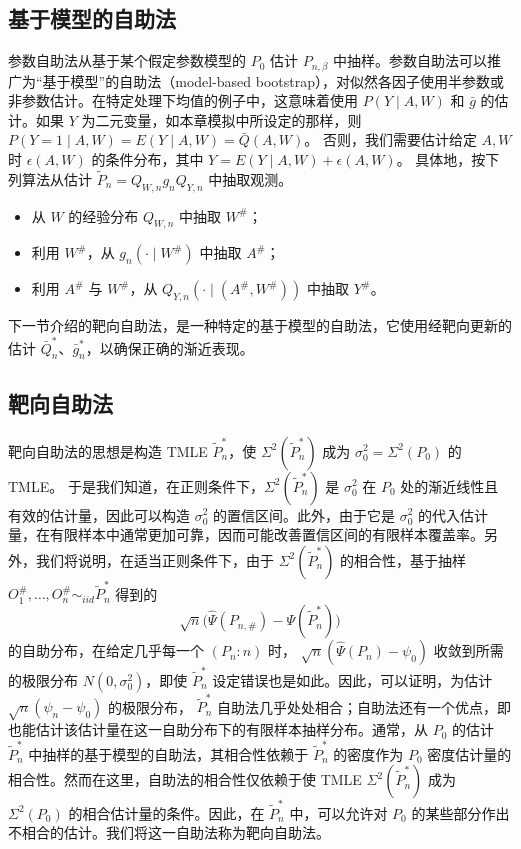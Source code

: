\subsection{基于模型的自助法}

参数自助法从基于某个假定参数模型的 $P_0$ 估计 $P_{n,\beta}$ 中抽样。参数自助法可以推广为“基于模型”的自助法（model-based bootstrap），对似然各因子使用半参数或非参数估计。在特定处理下均值的例子中，这意味着使用 $P(Y\mid A,W)$ 和 $\bar g$ 的估计。如果 $Y$ 为二元变量，如本章模拟中所设定的那样，则
$P(Y=1\mid A,W)=E(Y\mid A,W)=\bar Q(A,W)$。
否则，我们需要估计给定 $A,W$ 时 $\epsilon(A,W)$ 的条件分布，其中
$Y=E(Y\mid A,W)+\epsilon(A,W)$。
具体地，按下列算法从估计 $\tilde P_n=Q_{W,n}g_nQ_{Y,n}$ 中抽取观测。

\noindent\begin{minipage}{\linewidth}
\begin{sourcebox}[算法。基于模型的自助法]
\begin{itemize}[label=$\star$,leftmargin=1.6em]
\item 从 $W$ 的经验分布 $Q_{W,n}$ 中抽取 $W^\#$；
\item 利用 $W^\#$，从 $g_n(\cdot\mid W^\#)$ 中抽取 $A^\#$；
\item 利用 $A^\#$ 与 $W^\#$，从
$Q_{Y,n}(\cdot\mid(A^\#,W^\#))$ 中抽取 $Y^\#$。
\end{itemize}
\end{sourcebox}
\end{minipage}\par

下一节介绍的靶向自助法，是一种特定的基于模型的自助法，它使用经靶向更新的估计 $\bar Q_n^*$、$\bar g_n^*$，以确保正确的渐近表现。

\subsection{靶向自助法}

靶向自助法的思想是构造 TMLE $\tilde P_n^*$，使
$\Sigma^2(\tilde P_n^*)$ 成为 $\sigma_0^2=\Sigma^2(P_0)$ 的 TMLE。
于是我们知道，在正则条件下，$\Sigma^2(\tilde P_n^*)$ 是 $\sigma_0^2$ 在 $P_0$ 处的渐近线性且有效的估计量，因此可以构造 $\sigma_0^2$ 的置信区间。此外，由于它是 $\sigma_0^2$ 的代入估计量，在有限样本中通常更加可靠，因而可能改善置信区间的有限样本覆盖率。另外，我们将说明，在适当正则条件下，由于 $\Sigma^2(\tilde P_n^*)$ 的相合性，基于抽样
$O_1^\#,\ldots,O_n^\#\sim_{iid}\tilde P_n^*$ 得到的
\[
 \sqrt n\bigl(\hat\Psi(P_{n,\#})-\Psi(\tilde P_n^*)\bigr)
\]
的自助分布，在给定几乎每一个 $(P_n:n)$ 时，
$\sqrt n(\hat\Psi(P_n)-\psi_0)$ 收敛到所需的极限分布
$N(0,\sigma_0^2)$，即使 $\tilde P_n^*$ 设定错误也是如此。因此，可以证明，为估计 $\sqrt n(\psi_n-\psi_0)$ 的极限分布，
$\tilde P_n^*$ 自助法几乎处处相合；自助法还有一个优点，即也能估计该估计量在这一自助分布下的有限样本抽样分布。通常，从 $P_0$ 的估计 $\tilde P_n^*$ 中抽样的基于模型的自助法，其相合性依赖于 $\tilde P_n^*$ 的密度作为 $P_0$ 密度估计量的相合性。然而在这里，自助法的相合性仅依赖于使 TMLE $\Sigma^2(\tilde P_n^*)$ 成为 $\Sigma^2(P_0)$ 的相合估计量的条件。因此，在 $\tilde P_n^*$ 中，可以允许对 $P_0$ 的某些部分作出不相合的估计。我们将这一自助法称为靶向自助法。

